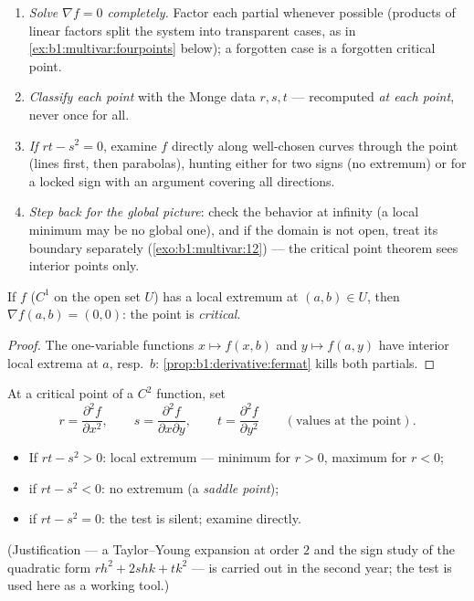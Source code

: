 \begin{method}
\label{met:b1:multivar:extremamethod}
\begin{enumerate}
  \item \emph{Solve $\nabla f = 0$ completely.} Factor each
        partial whenever possible (products of linear factors
        split the system into transparent cases, as in
        \cref{ex:b1:multivar:fourpoints} below); a forgotten
        case is a forgotten critical point.
  \item \emph{Classify each point} with the Monge data $r, s,
        t$ --- recomputed \emph{at each point}, never once for
        all.
  \item \emph{If $rt - s^2 = 0$}, examine $f$ directly along
        well-chosen curves through the point (lines first, then
        parabolas), hunting either for two signs (no extremum)
        or for a locked sign with an argument covering all
        directions.
  \item \emph{Step back for the global picture}: check the
        behavior at infinity (a local minimum may be no global
        one), and if the domain is not open, treat its boundary
        separately (\cref{exo:b1:multivar:12}) --- the critical
        point theorem sees interior points only.
\end{enumerate}
\end{method}

\begin{theorem}\label{thm:b1:multivar:critical}
If $f$ ($C^1$ on the open set $U$) has a local extremum at $(a,b)
\in U$, then $\nabla f(a,b) = (0,0)$: the point is
\emph{critical}.
\end{theorem}

\begin{proof}
The one-variable functions $x \mapsto f(x, b)$ and $y \mapsto f(a,
y)$ have interior local extrema at $a$, resp.\ $b$:
\cref{prop:b1:derivative:fermat} kills both partials.
\end{proof}

\begin{method}\label{met:b1:multivar:monge}
At a critical point of a $C^2$ function, set
\[
r = \frac{\partial^2 f}{\partial x^2},
\qquad
s = \frac{\partial^2 f}{\partial x \partial y},
\qquad
t = \frac{\partial^2 f}{\partial y^2}
\qquad (\text{values at the point}).
\]
\begin{itemize}
  \item If $rt - s^2 > 0$: local extremum --- minimum for $r > 0$,
        maximum for $r < 0$;
  \item if $rt - s^2 < 0$: no extremum (a \emph{saddle
        point});
  \item if $rt - s^2 = 0$: the test is silent; examine directly.
\end{itemize}
(Justification --- a Taylor--Young expansion at order $2$ and the
sign study of the quadratic form $r h^2 + 2shk + tk^2$ --- is
carried out in the second year; the test is used here as a working
tool.)
\end{method}

